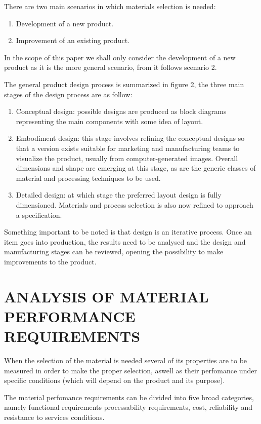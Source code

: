 \documentclass[letterpaper]{article}
\begin{document}
\begin{multicols}{2}
	There are two main scenarios in which materials selection is needed:
	\begin{enumerate}
		\item Development of a new product.
		\item Improvement of an existing product.
	\end{enumerate}
	In the scope of this paper we shall only consider the development of a new product as it is the more general scenario, from it follows scenario 2.
	
	The general product design process is summarized in figure 2, the three main stages of the design process are as follow:

	\begin{enumerate}
		\item Conceptual design: possible designs are produced as block diagrams representing the main components with some idea of layout.
		\item Embodiment design: this stage involves refining the conceptual designs so that a version exists suitable for marketing and manufacturing teams to visualize the product, usually from computer-generated images. Overall dimensions and shape are emerging at this stage, as are the generic classes of material and processing techniques to be used.
		\item Detailed design: at which stage the preferred layout design is fully dimensioned. Materials and process selection is also now refined to approach a specification.
	\end{enumerate}

	Something important to be noted is that design is an iterative process. Once an item goes into production, the results need to be analysed and the design and manufacturing stages can be reviewed, opening the possibility to make improvements to the product. \supercite{charles97}
	\section{ANALYSIS OF MATERIAL PERFORMANCE REQUIREMENTS}
	When the selection of the material is needed several of its properties are to be measured in order to make the proper selection, aswell as their perfomance under specific conditions (which will depend on the product and its purpose).

	The material perfomance requirements can be divided into five broad categories, namely functional requirements processability requirements, cost, reliability and resistance to services conditions.
	

\end{multicols}
\end{document}
